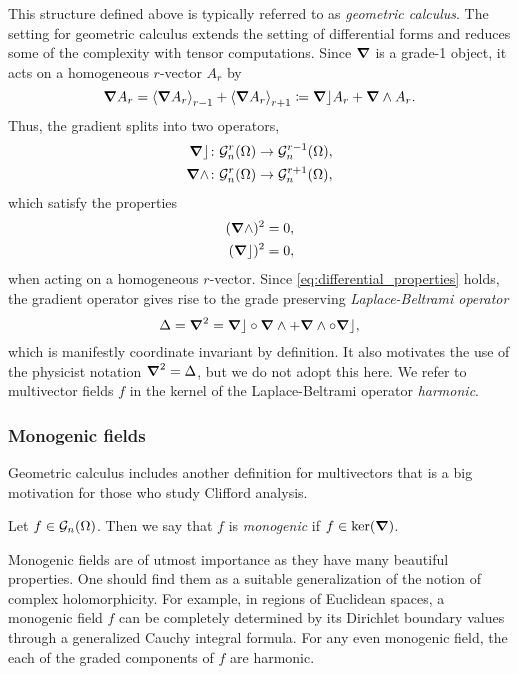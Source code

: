 This structure defined above is typically referred to as \emph{geometric calculus}.  The setting for geometric calculus extends the setting of differential forms and reduces some of the complexity with tensor computations.  Since $\grad$ is a grade-1 object, it acts on a homogeneous $r$-vector $A_r$ by
\begin{equation}
\grad A_r = \proj{r-1}{\grad A_r} + \proj{r+1}{\grad A_r} \coloneqq \grad \rfloor A_r + \grad \wedge A_r.
\end{equation}
Thus, the gradient splits into two operators, 
\begin{align}
\grad \rfloor &\colon \G_n^r(\Omega) \to \G_n^{r-1}(\Omega), \\
\grad \wedge &\colon \G_n^r(\Omega) \to \G_n^{r+1}(\Omega),
\end{align}
which satisfy the properties
\begin{align}
\label{eq:differential_properties}
(\grad \wedge)^2=0,\\
(\grad \rfloor)^2 = 0,
\end{align}
when acting on a homogeneous $r$-vector. Since \ref{eq:differential_properties} holds, the gradient operator gives rise to the grade preserving \emph{Laplace-Beltrami operator}
\[
\Delta = \grad^2 = \grad \rfloor \circ \grad \wedge + \grad \wedge \circ \grad \rfloor,
\]
which is manifestly coordinate invariant by definition.  It also motivates the use of the physicist notation $\grad^2=\Delta$, but we do not adopt this here.  We refer to multivector fields $f$ in the kernel of the Laplace-Beltrami operator \emph{harmonic}.

\subsubsection{Monogenic fields}

Geometric calculus includes another definition for multivectors that is a big motivation for those who study Clifford analysis. 
\begin{definition}
 Let $f \in \G_n(\Omega)$. Then we say that $f$ is \emph{monogenic} if $f \in \ker(\grad)$.
\end{definition}

Monogenic fields are of utmost importance as they have many beautiful properties. One should find them as a suitable generalization of the notion of complex holomorphicity. For example, in regions of Euclidean spaces, a monogenic field $f$ can be completely determined by its Dirichlet boundary values through a generalized Cauchy integral formula. For any even monogenic field, the each of the graded components of $f$ are harmonic.  

